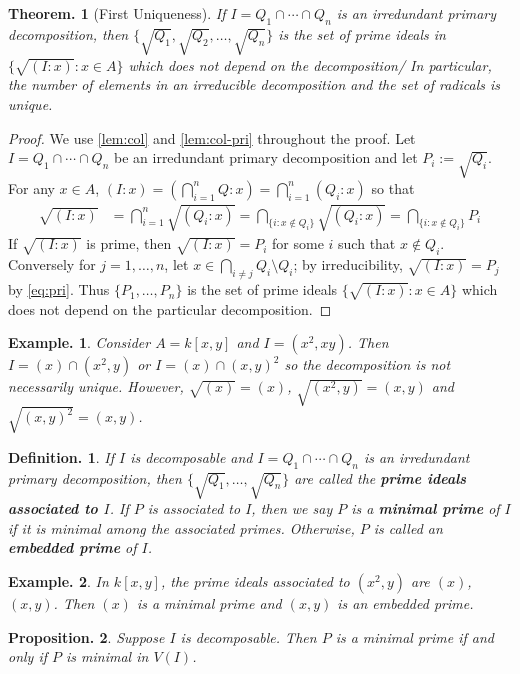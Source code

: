 \documentclass[11pt, a4paper]{memoir}
\theoremstyle{change}
\newtheorem{theorem}{Theorem.}[section]
\newtheorem{proposition}[theorem]{Proposition.}
\theoremstyle{plain}
\theoremstyle{nonumberplain}
\newtheorem{definition}{Definition.}
\newtheorem{example}{Example.}
\newtheorem{proof}{Proof}
\numberwithin{equation}{section}
\begin{document}
\begin{theorem}[First Uniqueness]\label{thm:dec-uni}
    If $I=Q_1\cap\cdots\cap Q_n$ is an irredundant primary decomposition, then $\{\sqrt{Q_1},\sqrt{Q_2},\ldots,\sqrt{Q_n}\}$ is the set of prime ideals in $\{\sqrt{(I:x)}:x\in A\}$ which does not depend on the decomposition/
    In particular, the number of elements in an irreducible decomposition and the set of radicals is unique.
\end{theorem}
\begin{proof}
    We use \cref{lem:col} and \cref{lem:col-pri} throughout the proof.
    Let $I=Q_1\cap\cdots\cap Q_n$ be an irredundant primary decomposition and let $P_i:=\sqrt{Q_i}$.
    For any $x\in A$, $(I:x) = \left(\bigcap_{i=1}^n Q:x\right)=\bigcap_{i=1}^n(Q_i:x)$ so that
    \begin{align}
        \sqrt{(I:x)} &= \bigcap_{i=1}^n\sqrt{(Q_i:x)}= \bigcap_{\{i:x\notin Q_i\}}\sqrt{(Q_i:x)} = \bigcap_{\{i:x\notin Q_i\}} P_i\label{eq:pri}
    \end{align}
    If $\sqrt{(I:x)}$ is prime, then $\sqrt{(I:x)}=P_i$ for some $i$ such that $x\notin Q_i$.
    Conversely for $j=1,\ldots,n$, let $x\in\bigcap_{i\neq j}Q_i\setminus Q_i$; by irreducibility, $\sqrt{(I:x)}=P_j$ by \cref{eq:pri}.
    Thus $\{P_1,\ldots,P_n\}$ is the set of prime ideals $\{\sqrt{(I:x)}:x\in A\}$ which does not depend on the particular decomposition.
\end{proof}
\begin{example}
    Consider $A=k[x,y]$ and $I=(x^2,xy)$.
    Then $I=(x)\cap(x^2,y)$ or $I=(x)\cap(x,y)^2$ so the decomposition is not necessarily unique.
    However, $\sqrt{(x)}=(x)$, $\sqrt{(x^2,y)}=(x,y)$ and $\sqrt{(x,y)^2}=(x,y)$.
\end{example}
\begin{definition}
    If $I$ is decomposable and $I=Q_1\cap\cdots\cap Q_n$ is an irredundant primary decomposition, then $\{\sqrt{Q_1},\ldots,\sqrt{Q_n}\}$ are called the \textbf{prime ideals associated to $I$}.
    If $P$ is associated to $I$, then we say $P$ is a \textbf{minimal prime} of $I$ if it is minimal among the associated primes.
    Otherwise, $P$ is called an \textbf{embedded prime} of $I$.
\end{definition}
\begin{example}
    In $k[x,y]$, the prime ideals associated to $(x^2,y)$ are $(x)$, $(x,y)$.
    Then $(x)$ is a minimal prime and $(x,y)$ is an embedded prime.
\end{example}
\begin{proposition}
    Suppose $I$ is decomposable.
    Then $P$ is a minimal prime if and only if $P$ is minimal in $V(I)$.
\end{proposition}
\end{document}
